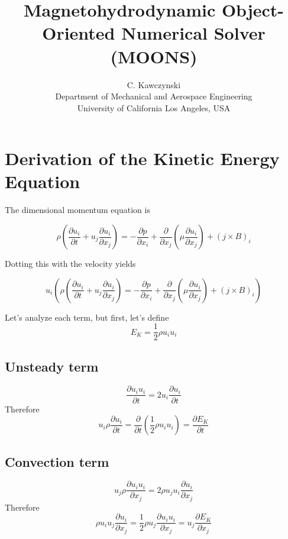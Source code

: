 \documentclass[11pt]{article}
\newcommand{\PD}{\partial}
\begin{document}
\doublespacing
\title{Magnetohydrodynamic Object-Oriented Numerical Solver (MOONS)}
\author{C. Kawczynski \\
Department of Mechanical and Aerospace Engineering \\
University of California Los Angeles, USA\\
}
\maketitle

\section{Derivation of the Kinetic Energy Equation}
The dimensional momentum equation is

\begin{equation}
	\rho \left(
	\frac{\PD u_i}{\PD t} +
	u_j\frac{\PD u_i}{\PD x_j}
	\right)
	=
	- \frac{\PD p}{\PD x_i}
	+ \frac{\PD}{\PD x_j} \left( \mu \frac{\PD u_i}{\PD x_j} \right)
	+ (j \times B)_i
\end{equation}

Dotting this with the velocity yields

\begin{equation}
	\boxed{
	u_i
	\left(
	\rho \left(
	\frac{\PD u_i}{\PD t} +
	u_j\frac{\PD u_i}{\PD x_j}
	\right)
	=
	- \frac{\PD p}{\PD x_i}
	+ \frac{\PD}{\PD x_j} \left( \mu \frac{\PD u_i}{\PD x_j} \right)
	+ (j \times B)_i
	\right)
	}
\end{equation}

Let's analyze each term, but first, let's define
\begin{equation}
	E_K = \frac{1}{2} \rho u_i u_i
\end{equation}

\subsection{Unsteady term}
\begin{equation}
	\frac{\PD u_i u_i}{\PD t} =
	2 u_i \frac{\PD u_i}{\PD t}
\end{equation}
Therefore
\begin{equation}
	\boxed{
	u_i \rho \frac{\PD u_i}{\PD t} =
	\frac{\PD}{\PD t} \left( \frac{1}{2} \rho u_i u_i \right) =
	\frac{\PD E_K}{\PD t}
	}
\end{equation}

\subsection{Convection term}
\begin{equation}
	u_j \rho \frac{\PD u_i u_i}{\PD x_j} =
	2 \rho u_j u_i \frac{\PD u_i}{\PD x_j}
\end{equation}
Therefore
\begin{equation}
	\boxed{
	\rho u_i u_j \frac{\PD u_i}{\PD x_j} =
	\frac{1}{2} \rho u_j \frac{\PD u_i u_i}{\PD x_j}
	= u_j \frac{\PD E_K}{\PD x_j}
	}
\end{equation}
\end{document}

